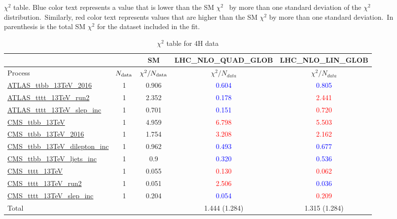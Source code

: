 \documentclass{article}
\begin{document}
$\chi^2$ table. Blue color text represents a value that is lower than the SM $\chi^2$ \
            by more than one standard deviation of the $\chi^2$ distribution.\
            Similarly, red color text represents values that are higher than the SM $\chi^2$ by more than one standard deviation.\
            In parenthesis is the total SM $\chi^2$ for the dataset included in the fit. \\
\begin{table}[H]
\centering
\begin{tabular}{|l|c|c|c|c|}
\hline
 \multicolumn{2}{|c|}{} & SM& LHC_NLO_QUAD_GLOB& LHC_NLO_LIN_GLOB\\ \hline
Process & $N_{\rm data}$ & $\chi^ 2/N_{\rm data}$& $\chi^ 2/N_{data}$& $\chi^ 2/N_{data}$\\ \hline
\href{https://arxiv.org}{ATLAS_ttbb_13TeV_2016} & 1 & 0.906 & \textcolor{blue}                            {0.604} & \textcolor{blue}                            {0.805} \\ \hline
\href{https://arxiv.org}{ATLAS_tttt_13TeV_run2} & 1 & 2.352 & \textcolor{blue}                            {0.178} & \textcolor{red}                            {2.441} \\ \hline
\href{https://arxiv.org}{ATLAS_tttt_13TeV_slep_inc} & 1 & 0.701 & \textcolor{blue}                            {0.151} & \textcolor{red}                            {0.720} \\ \hline
\href{https://arxiv.org}{CMS_ttbb_13TeV} & 1 & 4.959 & \textcolor{red}                            {6.798} & \textcolor{red}                            {5.503} \\ \hline
\href{https://arxiv.org}{CMS_ttbb_13TeV_2016} & 1 & 1.754 & \textcolor{red}                            {3.208} & \textcolor{red}                            {2.162} \\ \hline
\href{https://arxiv.org}{CMS_ttbb_13TeV_dilepton_inc} & 1 & 0.962 & \textcolor{blue}                            {0.493} & \textcolor{blue}                            {0.677} \\ \hline
\href{https://arxiv.org}{CMS_ttbb_13TeV_ljets_inc} & 1 & 0.9 & \textcolor{blue}                            {0.320} & \textcolor{blue}                            {0.536} \\ \hline
\href{https://arxiv.org}{CMS_tttt_13TeV} & 1 & 0.055 & \textcolor{red}                            {0.130} & \textcolor{red}                            {0.062} \\ \hline
\href{https://arxiv.org}{CMS_tttt_13TeV_run2} & 1 & 0.051 & \textcolor{red}                            {2.506} & \textcolor{blue}                            {0.036} \\ \hline
\href{https://arxiv.org}{CMS_tttt_13TeV_slep_inc} & 1 & 0.204 & \textcolor{blue}                            {0.054} & \textcolor{red}                            {0.209} \\ \hline
\hline Total & &  & 1.444 (1.284) & 1.315 (1.284) \\ \hline
\end{tabular}
\caption{$\chi^2$ table for 4H data}
\end{table}
\end{document}
